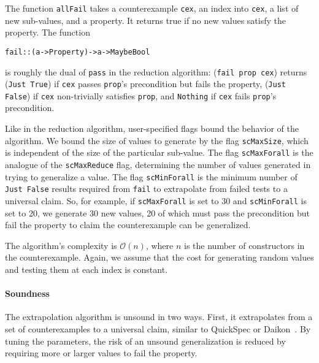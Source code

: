 \documentclass{sigplanconf}
\newenvironment{code}{\begin{alltt}\footnotesize}{\end{alltt}}
\newcommand{\ttp}[1]{\texttt{#1}}
\begin{document}
The function \ttp{allFail} takes a counterexample \ttp{cex}, an index into
\ttp{cex}, a list of new sub-values, and a property.  It returns true if no new
values satisfy the property.  The function
%
\begin{code}
fail :: (a -> Property) -> a -> Maybe Bool
\end{code}
%
\noindent
is roughly the dual of \ttp{pass} in the reduction algorithm: (\ttp{fail
  prop cex}) returns (\ttp{Just True}) if \ttp{cex} passes \ttp{prop}'s
precondition but fails the property, (\ttp{Just False}) if \ttp{cex}
non-trivially satisfies \ttp{prop}, and \ttp{Nothing} if \ttp{cex} fails
\ttp{prop}'s precondition.

Like in the reduction algorithm, user-specified flags bound the behavior of the
algorithm.  We bound the size of values to generate by the flag \ttp{scMaxSize},
which is independent of the size of the particular sub-value.  The flag
\ttp{scMaxForall} is the analogue of the \ttp{scMaxReduce} flag, determining the
number of values generated in trying to generalize a value.  The flag
\ttp{scMinForall} is the minimum number of \ttp{Just False} results required
from \ttp{fail} to extrapolate from failed tests to a universal claim.  So, for
example, if \ttp{scMaxForall} is set to 30 and \ttp{scMinForall} is set to 20,
we generate 30 new values, 20 of which must pass the precondition but fail the
property to claim the counterexample can be generalized.

The algorithm's complexity is $\mathcal{O}(n)$, where $n$ is the number of
constructors in the counterexample.  Again, we assume that the cost for
generating random values and testing them at each index is constant.

\paragraph{Soundness}
The extrapolation algorithm is unsound in two ways.  First, it extrapolates from
a set of counterexamples to a universal claim, similar to QuickSpec or
Daikon~\cite{qs,daikon}.  By tuning the parameters, the risk of an unsound
generalization is reduced by requiring more or larger values to fail the
property.
\end{document}
